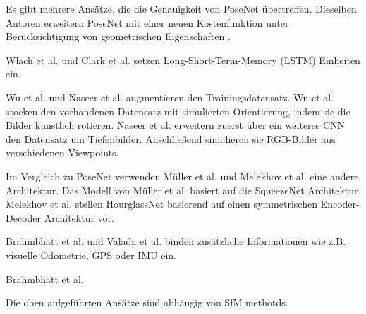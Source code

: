 Es gibt mehrere Ansätze, die die Genauigkeit von PoseNet übertreffen.
Dieselben Autoren erweitern PoseNet mit einer neuen Kostenfunktion unter Berücksichtigung von geometrischen Eigenschaften \cite{kendallGeometricLossFunctions2017}. 

Wlach et al. \cite{walchImagebasedLocalizationUsing2016} und Clark et al. \cite{clarkVidLocDeepSpatioTemporal2017} setzen Long-Short-Term-Memory (LSTM) \cite{hochreiterLongShortTermMemory1997a} Einheiten ein. 


Wu et al. \cite{wuDelvingDeeperConvolutional2017} und Naseer et al. \cite{naseerDeepRegressionMonocular2017} augmentieren den Trainingsdatensatz. 
Wu et al. \cite{wuDelvingDeeperConvolutional2017} stocken den vorhandenen Datensatz mit simulierten Orientierung, indem sie die Bilder künstlich rotieren. Naseer et al. \cite{naseerDeepRegressionMonocular2017} erweitern zuerst über ein weiteres CNN den Datensatz um Tiefenbilder. Anschließend simulieren sie RGB-Bilder aus verschiedenen Viewpoints.


Im Vergleich zu PoseNet verwenden Müller et al. \cite{mullerSQUEEZEPOSENETIMAGEBASED2017} und Melekhov et al.\cite{melekhovImageBasedLocalizationUsing2017} eine andere Architektur. 
Das Modell von Müller et al. \cite{mullerSQUEEZEPOSENETIMAGEBASED2017} basiert auf die SqueezeNet\cite{iandolaSqueezeNetAlexNetlevelAccuracy2016} Architektur. Melekhov et al. stellen HourglassNet \cite{melekhovImageBasedLocalizationUsing2017} basierend auf  einen symmetrischen Encoder-Decoder Architektur vor.

Brahmbhatt et al. \cite{brahmbhattGeometryAwareLearningMaps2018} und Valada et al. \cite{valadaDeepAuxiliaryLearning2018, valadaIncorporatingSemanticGeometric} binden zusätzliche Informationen wie z.B. visuelle Odometrie, GPS oder IMU ein.

Brahmbhatt et al. \cite{brahmbhattGeometryAwareLearningMaps2018} 

Die oben aufgeführten Ansätze sind abhängig von SfM methotds.



% 
